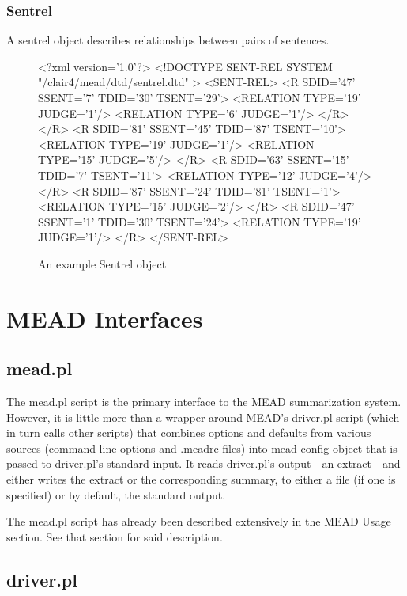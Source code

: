 \documentclass[10pt]{article}
\begin{document}
\subsubsection{Sentrel}

A sentrel object describes relationships between pairs of sentences.

\begin{figure}[htp!]
\centering
\scriptsize
\begin{boxedverbatim}
<?xml version='1.0'?>
<!DOCTYPE SENT-REL SYSTEM "/clair4/mead/dtd/sentrel.dtd" >
<SENT-REL>
<R SDID='47' SSENT='7' TDID='30' TSENT='29'>
<RELATION TYPE='19' JUDGE='1'/>
<RELATION TYPE='6' JUDGE='1'/>
</R>
</R>
<R SDID='81' SSENT='45' TDID='87' TSENT='10'>
<RELATION TYPE='19' JUDGE='1'/>
<RELATION TYPE='15' JUDGE='5'/>
</R>
<R SDID='63' SSENT='15' TDID='7' TSENT='11'>
<RELATION TYPE='12' JUDGE='4'/>
</R>
<R SDID='87' SSENT='24' TDID='81' TSENT='1'>
<RELATION TYPE='15' JUDGE='2'/>
</R>
<R SDID='47' SSENT='1' TDID='30' TSENT='24'>
<RELATION TYPE='19' JUDGE='1'/>
</R>
</SENT-REL>
\end{boxedverbatim}
\caption {An example Sentrel object}
\end{figure}





\section{MEAD Interfaces}

\subsection{mead.pl}

The mead.pl script is the primary interface to the MEAD
summarization system.  However, it is little more
than a wrapper around MEAD's driver.pl script (which in
turn calls other scripts) that combines options and defaults
from various sources (command-line options and .meadrc files)
into mead-config object that is passed to driver.pl's standard
input.  It reads driver.pl's output---an extract---and either
writes the extract or the corresponding summary, to either
a file (if one is specified) or by default, the standard
output.

The mead.pl script has already been described extensively in 
the MEAD Usage section.  See that section for said description.

\subsection{driver.pl}
\end{document}
